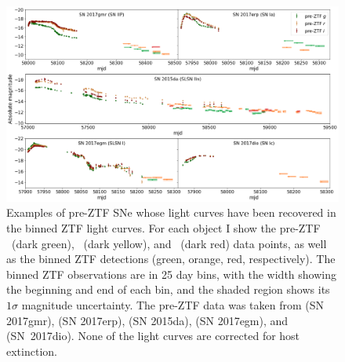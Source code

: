 \documentclass[a4paper,oneside,12pt, class=Latex/Classes/PhDthesisPSnPDF, crop=false]{standalone}
\begin{document}
\begin{figure}[h!]
    \centering
    \includegraphics[width=\textwidth]{../Images/chapter_4/tails.png}
    \caption[Examples of pre-ZTF SNe with tails detectable in ZTF.]{Examples of pre-ZTF SNe whose light curves have been recovered in the binned ZTF light curves. For each object I show the pre-ZTF \ztfg~(dark green), \ztfr~(dark yellow), and \ztfi~(dark red) data points, as well as the binned ZTF detections (green, orange, red, respectively). The binned ZTF observations are in 25 day bins, with the width showing the beginning and end of each bin, and the shaded region shows its $1\sigma$ magnitude uncertainty. The pre-ZTF data was taken from \citet{2017gmr} (SN 2017gmr), \citet{2017erp} (SN 2017erp), \citet{2015da_2020} (SN 2015da), \citet{2017egm} (SN 2017egm), and \citet{2017dio} (SN~2017dio). None of the light curves are corrected for host extinction.}
    \label{tail-examples}
\end{figure}
\end{document}
